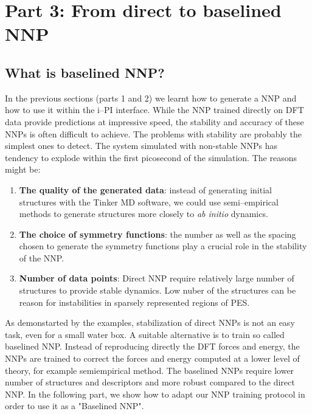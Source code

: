 \documentclass[12pt]{article}
\begin{document}
\section{Part 3: From direct to baselined NNP}
%
\subsection{What is baselined NNP?}
In the previous sections (parts 1 and 2) we learnt how to generate a NNP and how to use it within the i--PI interface. While the NNP trained directly on DFT data provide predictions at impressive speed, the stability and accuracy of these NNPs is often difficult to achieve. The problems with stability are probably the simplest ones to detect. The system simulated with non-stable NNPs has tendency to explode within the first picosecond of the simulation. The reasons might be:
\begin{enumerate}
    \item \textbf{The quality of the generated data}: instead of generating initial structures with the Tinker MD software, we could use semi--empirical methods to generate structures more closely to \textit{ab initio} dynamics. 
    \item \textbf{The choice of symmetry functions}: the number as well as the spacing chosen to generate the symmetry functions play a crucial role in the stability of the NNP. 
    \item \textbf{Number of data points}: Direct NNP require relatively large number of structures to provide stable dynamics. Low nuber of the structures can be reason for instabilities in sparsely represented regions of PES.
\end{enumerate}
As demonstarted by the examples, stabilization of direct NNPs is not an easy task, even for a small water box. A suitable alternative is to train so called baselined NNP. Instead of reproducing directly the DFT forces and energy, the NNPs are trained to correct the forces and energy computed at a lower level of theory, for example semiempirical method. The baselined NNPs require lower number of structures and descriptors and more robust compared to the direct NNP. In the following part, we show how to adapt our NNP training protocol in order to use it as a "Baselined NNP". 
%
\end{document}
